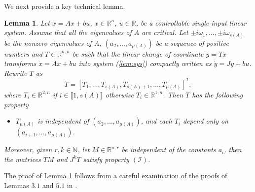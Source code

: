 \documentclass[letterpaper, 10pt]{article}
\newtheorem{lem}{Lemma}
\newcommand{\rref}[1]{(\ref{#1})}
\newcommand{\ical}{\mathcal{I}}
\newcommand{\reels}{\mathbb{R}}
\newcommand{\entiers}{\mathbb{N}}
\begin{document}
We next provide a key technical lemma.
\begin{lem}
\label{lem:struct:l}
Let $\dot{x}=Ax + b u $, $x \in \reels^n$, $u\in\reels$, be a controllable single input linear system. Assume that all the eigenvalues of $A$ are critical. Let $ \pm i \omega_1, \ldots , \pm i \omega_{s(A)} $ be the nonzero eigenvalues of $A$, $(a_2, \ldots , a_{\mu(A)})$ be a sequence of positive numbers and $T \in \reels^{n,n}$ be such that the linear change of coordinate $y=Tx$ transforms $\dot{x}  = A x + bu$ into system \rref{lem:sys} compactly written as $\dot{y}=J y + b u$. Rewrite $T$ as $$T=[T_1 , \ldots , T_{s(A)}, T_{s(A)+1}, \ldots, T_{\mu(A)}]^T,$$ where $T_i \in \reels^{2,n}$ if $i \in \llbracket 1, s(A) \rrbracket$ otherwise $T_i \in \reels^{1,n}$. 
Then $T$ has the following property
\begin{itemize}
\item[$(\ical)$ :]  $T_{\mu(A)}$ is independent of $(a_2, \ldots , a_{\mu(A)})$, and each $T_i$ depend only on $(a_{i+1}, \ldots , a_{\mu(A)})$.
\end{itemize}
 Moreover, given $r,k \in \entiers$, let $M \in \reels^{n,r}$ be independent of the constants $a_i$, then the matrices $T M$ and $J^k T$ satisfy property $(\ical)$. 
\end{lem} The proof of Lemma \ref{lem:struct:l} follows from a careful examination of the proofs of Lemmas $3.1$ and $5.1$ in \cite{SSY}.


\paragraph{}
\end{document}
